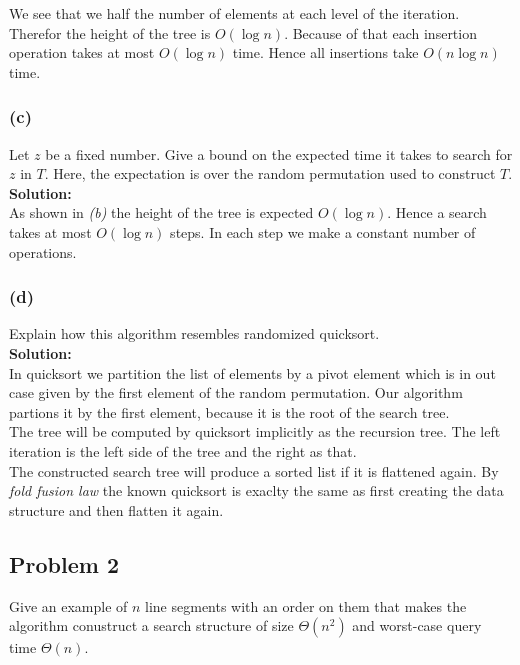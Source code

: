 \documentclass[11pt,a4paper,ngerman]{article}
\begin{document}
We see that we half the number of elements at each level of the iteration.
Therefor the height of the tree is $O(\log n)$. Because of that each insertion operation takes
at most $O(\log n)$ time. Hence all insertions take $O(n \log n )$ time.

\subsubsection*{(c)}

Let $z$ be a fixed number. Give a bound on the expected time it takes to search for $z$ in $T$. Here, the expectation is
over the random permutation used to construct $T$.\\

\textbf{Solution:}\\

As shown in \emph{(b)} the height of the tree is expected $O(\log n)$. Hence a search takes at most $O(\log n)$ steps.
In each step we make a constant number of operations.

\subsubsection*{(d)}

Explain how this algorithm resembles randomized quicksort.\\

\textbf{Solution:}\\

In quicksort we partition the list of elements by a pivot element which is in out case given by the first element
of the random permutation. Our algorithm partions it by the first element, because it is the root of the search tree.\\

The tree will be computed by quicksort implicitly as the recursion tree. The left iteration is the left side of the tree
and the right as that.\\

The constructed search tree will produce a sorted list if it is flattened again.
By \emph{fold fusion law} the known quicksort is exaclty the same as first creating the data structure and then flatten it
again.


\subsection*{Problem 2}

Give an example of $n$ line segments with an order on them that makes the algorithm conustruct a search structure of size $\Theta (n^2)$ and worst-case
query time $\Theta (n)$.\\
\end{document}
